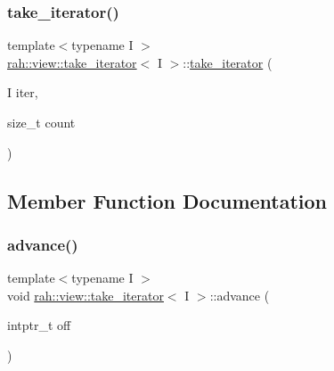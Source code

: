 \subsubsection{\texorpdfstring{take\_iterator()}{take\_iterator()}\hspace{0.1cm}{\footnotesize\ttfamily [4/4]}}
{\footnotesize\ttfamily template$<$typename I $>$ \\
\mbox{\hyperlink{structrah_1_1view_1_1take__iterator}{rah\+::view\+::take\+\_\+iterator}}$<$ I $>$\+::\mbox{\hyperlink{structrah_1_1view_1_1take__iterator}{take\+\_\+iterator}} (\begin{DoxyParamCaption}\item[{I}]{iter,  }\item[{size\+\_\+t}]{count }\end{DoxyParamCaption})\hspace{0.3cm}{\ttfamily [inline]}}



\subsection{Member Function Documentation}
\mbox{\label{structrah_1_1view_1_1take__iterator_a55e1c95489b33de8006af33b9511fb28}} 
\subsubsection{\texorpdfstring{advance()}{advance()}\hspace{0.1cm}{\footnotesize\ttfamily [1/2]}}
{\footnotesize\ttfamily template$<$typename I $>$ \\
void \mbox{\hyperlink{structrah_1_1view_1_1take__iterator}{rah\+::view\+::take\+\_\+iterator}}$<$ I $>$\+::advance (\begin{DoxyParamCaption}\item[{intptr\+\_\+t}]{off }\end{DoxyParamCaption})\hspace{0.3cm}{\ttfamily [inline]}}

\mbox{\label{structrah_1_1view_1_1take__iterator_a55e1c95489b33de8006af33b9511fb28}} 

